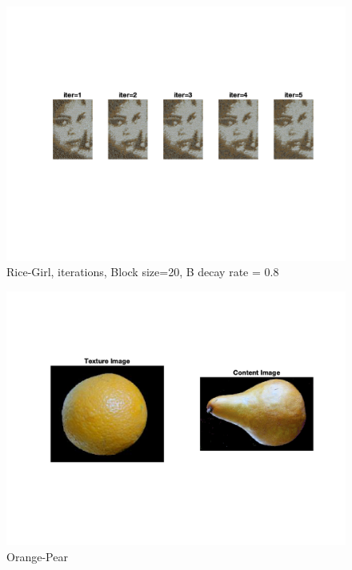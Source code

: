\documentclass[10pt,twocolumn,letterpaper]{article}
\begin{document}
\begin{figure}[h]
    \begin{center}
    \includegraphics[trim={2cm 6cm 2cm 4cm}, clip, scale=0.9]{../results/iters/res_rice_girl_b_20_bdr_0_800000.png}
    \end{center}
    \vspace{-0.2em}
    \caption{Rice-Girl, iterations, Block size=20, B decay rate = 0.8}
    \label{fig:rice_girl_iter}
\end{figure}


\begin{figure}[h]
    \begin{center}
    \includegraphics[trim={2cm 4cm 2cm 2cm}, clip, scale=0.5]{../results/bsize/inp_orange_pear.png}
    \end{center}
    \vspace{-0.2em}
    \caption{Orange-Pear}
    \label{fig:or_pear}
\end{figure}
\end{document}
